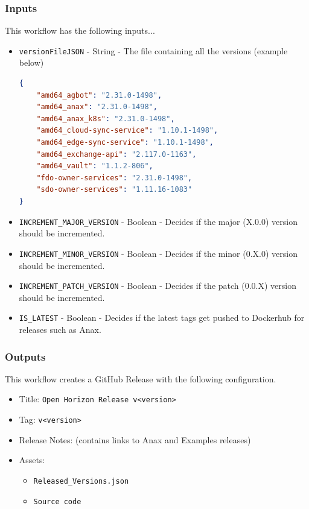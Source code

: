 \documentclass[a4paper,11pt]{article}
\begin{document}
\subsubsection{Inputs}
This workflow has the following inputs...
\begin{itemize}
    \item\verb|versionFileJSON| - String - The file containing all the versions (example below)
    \begin{lstlisting}[language=json]
{   
    "amd64_agbot": "2.31.0-1498",
    "amd64_anax": "2.31.0-1498",
    "amd64_anax_k8s": "2.31.0-1498",
    "amd64_cloud-sync-service": "1.10.1-1498",
    "amd64_edge-sync-service": "1.10.1-1498",
    "amd64_exchange-api": "2.117.0-1163",
    "amd64_vault": "1.1.2-806",
    "fdo-owner-services": "2.31.0-1498",
    "sdo-owner-services": "1.11.16-1083"
}
    \end{lstlisting}
    \item\verb|INCREMENT_MAJOR_VERSION| - Boolean - Decides if the major (X.0.0) version should be incremented.
    \item\verb|INCREMENT_MINOR_VERSION| - Boolean - Decides if the minor (0.X.0) version should be incremented.
    \item\verb|INCREMENT_PATCH_VERSION| - Boolean - Decides if the patch (0.0.X) version should be incremented.
    \item\verb|IS_LATEST| - Boolean - Decides if the latest tags get pushed to Dockerhub for releases such as Anax.

\end{itemize}

\subsubsection{Outputs}
This workflow creates a GitHub Release with the following configuration.
\begin{itemize}
    \item Title: \verb|Open Horizon Release v<version>|
    \item Tag: \verb|v<version>|
    \item Release Notes: (contains links to Anax and Examples releases)
    \item Assets:
    \begin{itemize}
        \item\verb|Released_Versions.json|
        \item\verb|Source code|
    \end{itemize}
\end{itemize}
\end{document}

